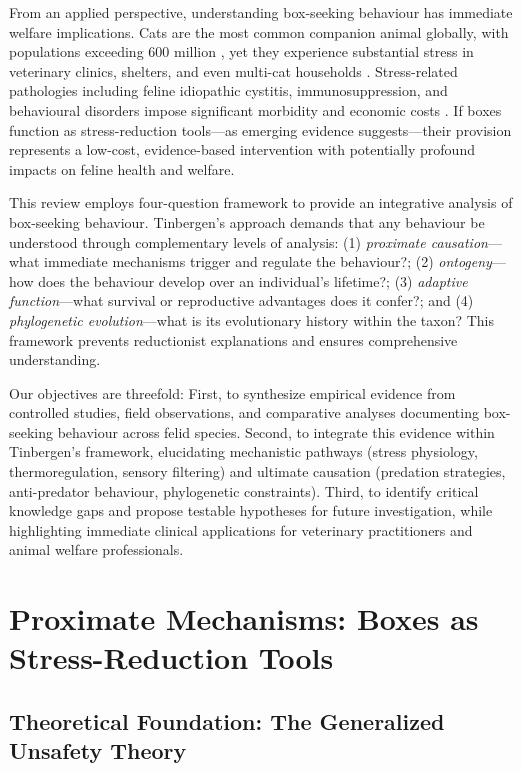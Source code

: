 \documentclass[12pt,a4paper]{article}
\begin{document}
From an applied perspective, understanding box-seeking behaviour has immediate welfare implications. Cats are the most common companion animal globally, with populations exceeding 600 million \citep{driscoll2009}, yet they experience substantial stress in veterinary clinics, shelters, and even multi-cat households \citep{rodan2016}. Stress-related pathologies including feline idiopathic cystitis, immunosuppression, and behavioural disorders impose significant morbidity and economic costs \citep{buffington2011}. If boxes function as stress-reduction tools—as emerging evidence suggests—their provision represents a low-cost, evidence-based intervention with potentially profound impacts on feline health and welfare.

This review employs \citet{tinbergen1963} four-question framework to provide an integrative analysis of box-seeking behaviour. Tinbergen's approach demands that any behaviour be understood through complementary levels of analysis: (1) \textit{proximate causation}—what immediate mechanisms trigger and regulate the behaviour?; (2) \textit{ontogeny}—how does the behaviour develop over an individual's lifetime?; (3) \textit{adaptive function}—what survival or reproductive advantages does it confer?; and (4) \textit{phylogenetic evolution}—what is its evolutionary history within the taxon? This framework prevents reductionist explanations and ensures comprehensive understanding.

Our objectives are threefold: First, to synthesize empirical evidence from controlled studies, field observations, and comparative analyses documenting box-seeking behaviour across felid species. Second, to integrate this evidence within Tinbergen's framework, elucidating mechanistic pathways (stress physiology, thermoregulation, sensory filtering) and ultimate causation (predation strategies, anti-predator behaviour, phylogenetic constraints). Third, to identify critical knowledge gaps and propose testable hypotheses for future investigation, while highlighting immediate clinical applications for veterinary practitioners and animal welfare professionals.

\section{Proximate Mechanisms: Boxes as Stress-Reduction Tools}

\subsection{Theoretical Foundation: The Generalized Unsafety Theory}
\end{document}

